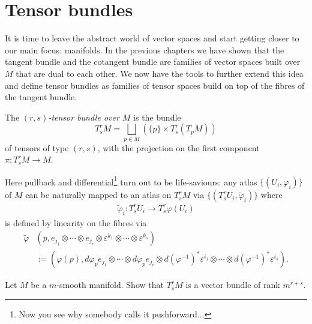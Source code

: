 \section{Tensor bundles}

It is time to leave the abstract world of vector spaces and start getting closer to our main focus: manifolds.
In the previous chapters we have shown that the tangent bundle and the cotangent bundle are families of vector spaces built over $M$ that are dual to each other.
We now have the tools to further extend this idea and define tensor bundles as families of tensor spaces build on top of the fibres of the tangent bundle.

\begin{definition}
	The \emph{$(r,s)$-tensor bundle over $M$} is the bundle
	\begin{equation}
		T_s^r M = \bigsqcup_{p\in M}\left(\{p\}\times T_s^r(T_p M)\right)
	\end{equation}
	of tensors of type $(r,s)$, with the projection on the first component $\pi:T_s^r M\to M$.
\end{definition}

Here pullback and differential\footnote{Now you see why somebody calls it pushforward...} turn out to be life-saviours:
any atlas $\{(U_i, \varphi_i)\}$ of $M$ can be naturally mapped to an atlas  on $T_s^r M$ via $\{(T_s^r U_i, \widetilde\varphi_i)\}$ where
\begin{align}
	\widetilde\varphi_i : T_s^r U_i \to T_s^r\varphi(U_i)
\end{align}
is defined by linearity on the fibres via
\begin{align}
	\widetilde\varphi & (p, e_{j_1}\otimes\cdots\otimes e_{j_r}\otimes \varepsilon^{k_1}\otimes \cdots\otimes \varepsilon^{k_s})                                                                     \\
	                  & :=(\varphi(p), d\varphi_p e_{j_1}\otimes\cdots\otimes d\varphi_p e_{j_r}\otimes d(\varphi^{-1})^*\varepsilon^{i_1}\otimes \cdots\otimes d(\varphi^{-1})^*\varepsilon^{i_s}).
\end{align}

\begin{exercise}
	Let $M$ be a $m$-smooth manifold.
	Show that $T^r_sM$ is a vector bundle of rank $m^{r+s}$.
\end{exercise}

